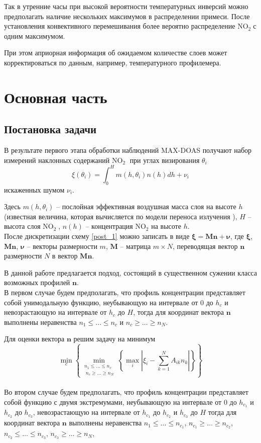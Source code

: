 \documentclass[a4paper,14pt]{article}
\theoremstyle{plain}
\theoremstyle{definition}
\theoremstyle{remark}
\newcommand{\nl}{\\ \indent}
\newcommand{\no}{$\text{NO}_2 \;$}
\begin{document}
Так в утренние часы при высокой вероятности температурных
инверсий можно предполагать наличие нескольких максимумов в
распределении примеси. 
После установления конвективного перемешивания более вероятно
распределение \no  с одним максимумом. 

При этом априорная информация об ожидаемом количестве слоев 
может корректироваться по данным, например, температурного
профилемера.

 
\section{Основная часть}
\subsection{Постановка задачи}

В результате первого этапа обработки наблюдений MAX-DOAS 
получают набор измерений наклонных содержаний \no 
при углах визирования $\theta_i$
\begin{equation}
\xi(\theta_i) = 
\int_0^H
m(h, \theta_i) n(h) dh + \nu_i
\label{post_1}
\end{equation}
искаженных шумом $\nu_i$.
 
Здесь $m(h, \theta_i)$ -- послойная эффективная воздушная 
масса слоя на высоте $h$ (известная величина, которая 
вычисляется по модели переноса излучения \cite{litlink2}), 
$H$ -- высота слоя \no, $n(h)$ -- концентрация $\text{NO}_2$ 
на высоте $h$.
\nl
После дискретизации схему \eqref{post_1} можно записать в виде 
$\pmb\xi = \textbf{Mn} + \pmb\nu$, где 
$\pmb\xi$, $\textbf{Mn}$, $\pmb \nu$ -- векторы размерности 
$m$, $\textbf{M}$ -- матрица $m \times N$, переводящая вектор 
$\textbf{n}$ размерности $N$ в вектор $\textbf{Mn}$.
 
В данной работе предлагается подход, состоящий в существенном
сужении класса возможных профилей {$\textbf{n}$}.
\nl 
В первом случае будем предполагать, что профиль концентрации
представляет собой унимодальную функцию, неубывающую на 
интервале от $0$ до $h_c$ и невозрастающую на интервале от 
$h_c$ до $H$, тогда для координат вектора $\textbf{n}$ 
выполнены неравенства $n_1 \leq \ldots \leq n_c$ и 
$n_c \geq \ldots \geq n_N$.

Для оценки вектора $\textbf{n}$ решим задачу на минимум
\begin{equation}
\min_{c}
\left\{
\min_{
\substack{
n_1 \leq \ldots \leq n_c \\
\; n_c \geq \ldots \geq n_N}
}
\left\{
\max_i
\left|
\xi_i -
\sum_{k=1}^{N}
A_{ik}n_k
\right|
\right\}
\right\}
\label{post_2}
\end{equation}
\nl 
Во втором случае будем предполагать, что профиль концентрации
представляет собой функцию с двумя экстремумами, неубывающую 
на интервале от $0$ до $h_{c_1}$ и $h_{c_2}$ до $h_{c_3}$,
невозрастающую на интервале от $h_{c_1}$ до $h_{c_2}$ и
$h_{c_3}$ до $H$ тогда для координат вектора 
$\textbf{n}$ выполнены неравенства 
$n_1 \leq \ldots \leq n_{c_1}$, 
$n_{c_1} \geq \ldots \geq n_{c_2}$,
$n_{c_2} \leq \ldots \leq n_{c_3}$,
$n_{c_3} \geq \ldots \geq n_{N}$,
 
\end{document}
